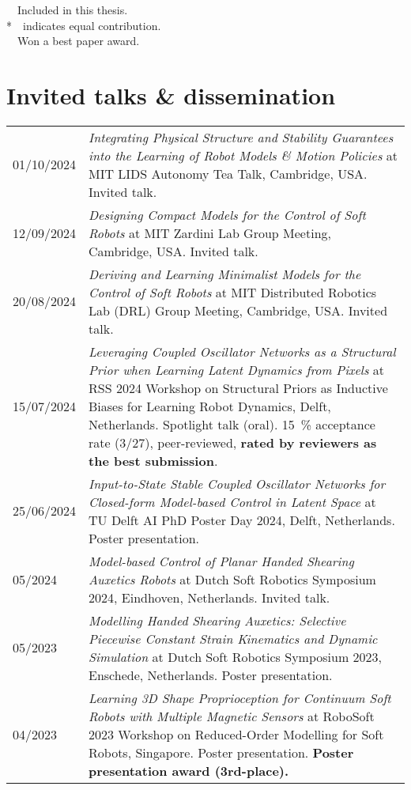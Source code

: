 \vspace{0.5cm}
\noindent
\faFileTextO~~Included in this thesis.\\
*~~indicates equal contribution.\\
\faTrophy~~Won a best paper award.

\section*{Invited talks \& dissemination}
\noindent
\begin{longtable}{p{} p{}}
    01/10/2024 & \emph{Integrating Physical Structure and Stability Guarantees into the Learning of Robot Models \& Motion Policies} at MIT LIDS Autonomy Tea Talk, Cambridge, USA. Invited talk.\\
    12/09/2024 & \emph{Designing Compact Models for the Control of Soft Robots} at MIT Zardini Lab Group Meeting, Cambridge, USA. Invited talk.\\
    20/08/2024 & \emph{Deriving and Learning Minimalist Models for the Control of Soft Robots} at MIT Distributed Robotics Lab (DRL) Group Meeting, Cambridge, USA. Invited talk.\\
    15/07/2024 & \emph{Leveraging Coupled Oscillator Networks as a Structural Prior when Learning Latent Dynamics from Pixels} at RSS 2024 Workshop on Structural Priors as Inductive Biases for
    Learning Robot Dynamics, Delft, Netherlands. Spotlight talk (oral). \SI{15}{\percent} acceptance rate (3/27), peer-reviewed, \textbf{rated by reviewers as the best submission}.\\
    25/06/2024 & \emph{Input-to-State Stable Coupled Oscillator Networks for Closed-form Model-based Control in Latent Space} at TU Delft AI PhD Poster Day 2024, Delft, Netherlands. Poster presentation.\\
    05/2024 & \emph{Model-based Control of Planar Handed Shearing Auxetics Robots} at Dutch Soft Robotics Symposium 2024, Eindhoven, Netherlands. Invited talk.\\
    05/2023 & \emph{Modelling Handed Shearing Auxetics: Selective Piecewise Constant Strain Kinematics and Dynamic Simulation} at Dutch Soft Robotics Symposium 2023, Enschede, Netherlands. Poster presentation.\\
    04/2023 & \emph{Learning 3D Shape Proprioception for Continuum Soft Robots with Multiple Magnetic Sensors} at RoboSoft 2023 Workshop on Reduced-Order Modelling for Soft Robots, Singapore. Poster presentation. \textbf{Poster presentation award (3rd-place).}\\

\end{longtable}
